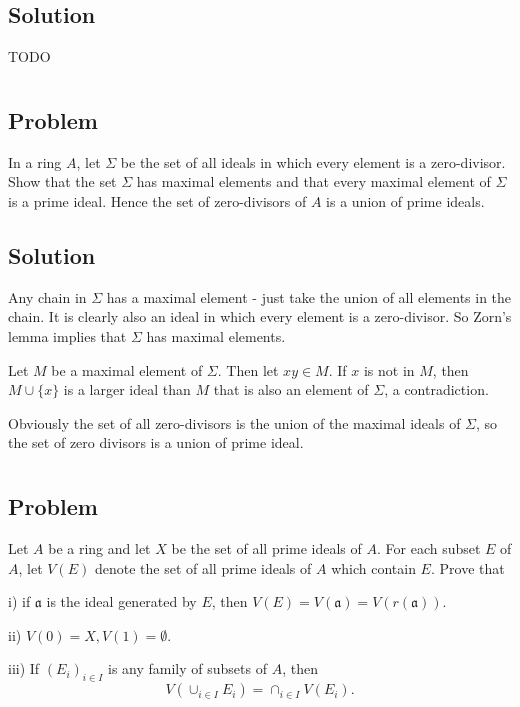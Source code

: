 \documentclass[book,12pt,oneside,openany]{memoir}
\begin{document}
\subsection{Solution}
TODO


\section{}
\subsection{Problem}
In a ring $A$, let $\Sigma$ be the set of all ideals in which every element is a zero-divisor. Show that the set $\Sigma$ has maximal elements and that every maximal element of $\Sigma$ is a prime ideal. Hence the set of zero-divisors of $A$ is a union of prime ideals.
\subsection{Solution}
Any chain in $\Sigma$ has a maximal element - just take the union of all elements in the chain. It is clearly also an ideal in which every element is a zero-divisor. So Zorn's lemma implies that $\Sigma$ has maximal elements. 

Let $M$ be a maximal element of $\Sigma$. Then let $xy \in M$. If $x$ is not in $M$, then $M \cup \{x\}$ is a larger ideal than $M$ that is also an element of $\Sigma$, a contradiction.

Obviously the set of all zero-divisors is the union of the maximal ideals of $\Sigma$, so the set of zero divisors is a union of prime ideal.



\section{}
\subsection{Problem}
Let $A$ be a ring and let $X$ be the set of all prime ideals of $A$. For each subset $E$ of $A$, let $V(E)$ denote the set of all prime ideals of $A$ which contain $E$. Prove that

i) if $\mathfrak{a}$ is the ideal generated by $E$, then $V(E) = V(\mathfrak{a}) = V(r(\mathfrak{a}))$.

ii) $V(0) = X, V(1) = \emptyset$.

iii) If $(E_i)_{i \in I}$ is any family of subsets of $A$, then \[V (\cup_{i \in I} E_i ) = \cap_{i \in I} V(E_i).\]
\end{document}
